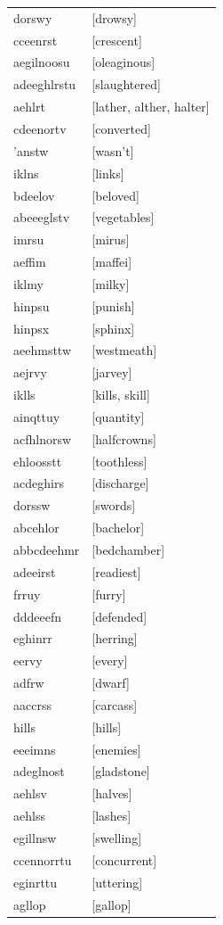 \documentclass{article}
\begin{document}
\begin{tabular}{ll}
dorswy & [drowsy] \\
cceenrst & [crescent] \\
aegilnoosu & [oleaginous] \\
adeeghlrstu & [slaughtered] \\
aehlrt & [lather, alther, halter] \\
cdeenortv & [converted] \\
'anstw & [wasn't] \\
iklns & [links] \\
bdeelov & [beloved] \\
abeeeglstv & [vegetables] \\
imrsu & [mirus] \\
aeffim & [maffei] \\
iklmy & [milky] \\
hinpsu & [punish] \\
hinpsx & [sphinx] \\
aeehmsttw & [westmeath] \\
aejrvy & [jarvey] \\
iklls & [kills, skill] \\
ainqttuy & [quantity] \\
acfhlnorsw & [halfcrowns] \\
ehloosstt & [toothless] \\
acdeghirs & [discharge] \\
dorssw & [swords] \\
abcehlor & [bachelor] \\
abbcdeehmr & [bedchamber] \\
adeeirst & [readiest] \\
frruy & [furry] \\
dddeeefn & [defended] \\
eghinrr & [herring] \\
eervy & [every] \\
adfrw & [dwarf] \\
aaccrss & [carcass] \\
hills & [hills] \\
eeeimns & [enemies] \\
adeglnost & [gladstone] \\
aehlsv & [halves] \\
aehlss & [lashes] \\
egillnsw & [swelling] \\
ccennorrtu & [concurrent] \\
eginrttu & [uttering] \\
agllop & [gallop] \\

\end{tabular}
\end{document}

